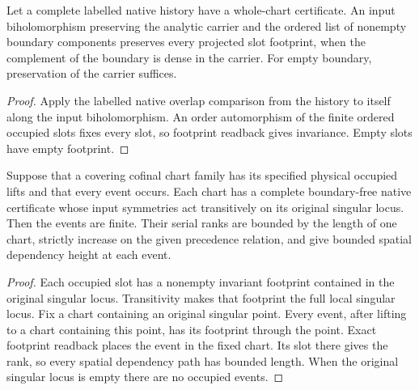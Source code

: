 \begin{proposition}
\label{hir:g8-native-occupied-footprint-symmetry}
\leanok
Let a complete labelled native history have a whole-chart certificate.
An input biholomorphism preserving the analytic carrier and the
ordered list of nonempty boundary components preserves every
projected slot footprint, when the complement of the boundary is
dense in the carrier. For empty boundary, preservation of the
carrier suffices.
\end{proposition}
\begin{proof}
Apply the labelled native overlap comparison from the history to
itself along the input biholomorphism. An order automorphism of the
finite ordered occupied slots fixes every slot, so footprint readback
gives invariance. Empty slots have empty footprint.
\end{proof}

\begin{theorem}
\label{hir:g8-native-homogeneous-rank}
\leanok
Suppose that a covering cofinal chart family has its specified
physical occupied lifts and that every event occurs. Each chart
has a complete boundary-free native certificate whose input
symmetries act transitively on its original singular locus.
Then the events are finite. Their serial ranks are bounded by the
length of one chart, strictly increase on the given precedence
relation, and give bounded spatial dependency height at each event.
\end{theorem}
\begin{proof}
Each occupied slot has a nonempty invariant footprint contained
in the original singular locus. Transitivity makes that footprint
the full local singular locus. Fix a chart containing an original
singular point. Every event, after lifting to a chart containing
this point, has its footprint through the point. Exact footprint
readback places the event in the fixed chart. Its slot there
gives the rank, so every spatial dependency path has bounded
length. When the original singular locus is empty there are no
occupied events.
\end{proof}

